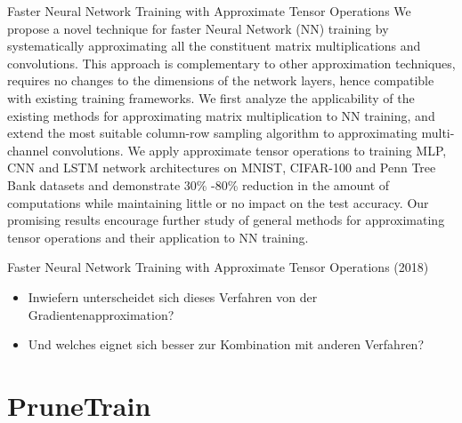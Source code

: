\documentclass[10pt]{beamer}
\begin{document}
\begin{frame}{Faster Neural Network Training with Approximate Tensor Operations }
 We propose a novel technique for faster Neural Network (NN) training by systematically approximating all the constituent matrix multiplications and convolutions. This approach is complementary to other approximation techniques, requires no changes to the dimensions of the network layers, hence compatible with existing training frameworks. We first analyze the applicability of the existing methods for approximating matrix multiplication to NN training, and extend the most suitable column-row sampling algorithm to approximating multi-channel convolutions. We apply approximate tensor operations to training MLP, CNN and LSTM network architectures on MNIST, CIFAR-100 and Penn Tree Bank datasets and demonstrate 30\% -80\% reduction in the amount of computations while maintaining little or no impact on the test accuracy. Our promising results encourage further study of general methods for approximating tensor operations and their application to NN training.
\end{frame}

\begin{frame}{Faster Neural Network Training with Approximate Tensor Operations (2018)}
 \begin{itemize}
  \item Inwiefern unterscheidet sich dieses Verfahren von der Gradientenapproximation?
  \item Und welches eignet sich besser zur Kombination mit anderen Verfahren?
 \end{itemize}

\end{frame}


\section{PruneTrain}
\end{document}
